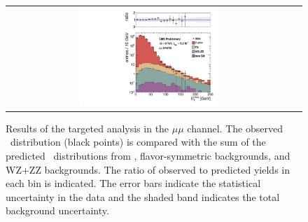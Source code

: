 \clearpage

\begin{figure}[!h]
\begin{center}
\begin{tabular}{cc}
\includegraphics[width=0.5\textwidth]{plots/pfmet_bvetoMedium_mm.pdf}
\end{tabular}
\caption{Results of the targeted analysis in the $\mu\mu$ channel. The observed \MET\ distribution (black points) is compared with the sum of the predicted \MET\
distributions from \zjets, flavor-symmetric backgrounds, and WZ+ZZ backgrounds. The ratio of observed to predicted yields in each bin is
indicated. The error bars indicate the statistical uncertainty in the data and the shaded band indicates the total background uncertainty.
\label{fig:results_targ_mm}
}
\end{center}
\end{figure}



